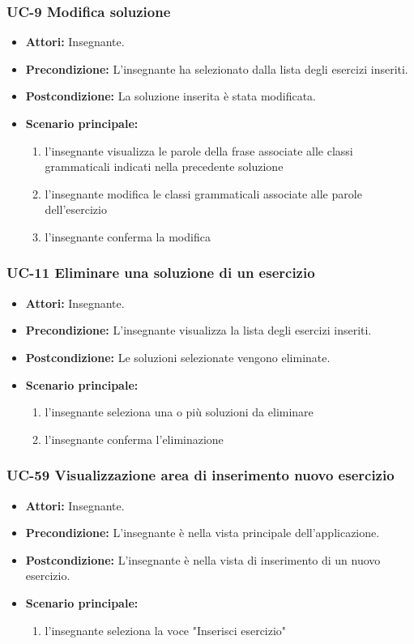 \subsubsection{UC-9 Modifica soluzione}
\begin{itemize}
	\item \textbf{Attori:} Insegnante.
	\item \textbf{Precondizione:} L'insegnante ha selezionato dalla lista degli esercizi inseriti.
	\item \textbf{Postcondizione:} La soluzione inserita è stata modificata.
	\item \textbf{Scenario principale:}
		\begin{enumerate}
		\item l'insegnante visualizza le parole della frase associate alle classi grammaticali indicati nella precedente soluzione
		\item l'insegnante modifica le classi grammaticali associate alle parole dell'esercizio
		\item l'insegnante conferma la modifica
		\end{enumerate}
\end{itemize}
	
\subsubsection{UC-11 Eliminare una soluzione di un esercizio}
\begin{itemize}
	\item \textbf{Attori:} Insegnante.
	\item \textbf{Precondizione:} L'insegnante visualizza la lista degli esercizi inseriti.
	\item \textbf{Postcondizione:} Le soluzioni selezionate vengono eliminate.
	\item \textbf{Scenario principale:}
		\begin{enumerate}
			\item l'insegnante seleziona una o più soluzioni da eliminare
			\item l'insegnante conferma l'eliminazione
		\end{enumerate}
\end{itemize}

\subsubsection{UC-59 Visualizzazione area di inserimento nuovo esercizio}
\begin{itemize}
		\item \textbf{Attori: }Insegnante.
		\item \textbf{Precondizione: }L'insegnante è nella vista principale dell'applicazione.
		\item \textbf{Postcondizione: }L'insegnante è nella vista di inserimento di un nuovo esercizio.
		\item \textbf{Scenario principale: }
	\begin{enumerate} 
		\item l'insegnante seleziona la voce "Inserisci esercizio"
	\end{enumerate}
\end{itemize}

